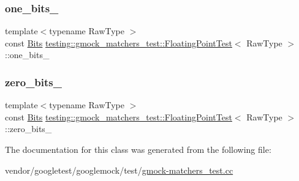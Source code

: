 \subsubsection{\texorpdfstring{one\+\_\+bits\+\_\+}{one\_bits\_}}
{\footnotesize\ttfamily template$<$typename Raw\+Type $>$ \\
const \hyperlink{classtesting_1_1gmock__matchers__test_1_1_floating_point_test_addf899bd832ae51103198d201d2f2ea2}{Bits} \hyperlink{classtesting_1_1gmock__matchers__test_1_1_floating_point_test}{testing\+::gmock\+\_\+matchers\+\_\+test\+::\+Floating\+Point\+Test}$<$ Raw\+Type $>$\+::one\+\_\+bits\+\_\+\hspace{0.3cm}{\ttfamily [protected]}}

\mbox{\label{classtesting_1_1gmock__matchers__test_1_1_floating_point_test_afb9b6beb1f152693155cf7db4e1fc4d2}} 
\subsubsection{\texorpdfstring{zero\+\_\+bits\+\_\+}{zero\_bits\_}}
{\footnotesize\ttfamily template$<$typename Raw\+Type $>$ \\
const \hyperlink{classtesting_1_1gmock__matchers__test_1_1_floating_point_test_addf899bd832ae51103198d201d2f2ea2}{Bits} \hyperlink{classtesting_1_1gmock__matchers__test_1_1_floating_point_test}{testing\+::gmock\+\_\+matchers\+\_\+test\+::\+Floating\+Point\+Test}$<$ Raw\+Type $>$\+::zero\+\_\+bits\+\_\+\hspace{0.3cm}{\ttfamily [protected]}}



The documentation for this class was generated from the following file\+:\begin{DoxyCompactItemize}
\item 
vendor/googletest/googlemock/test/\hyperlink{gmock-matchers__test_8cc}{gmock-\/matchers\+\_\+test.\+cc}\end{DoxyCompactItemize}
